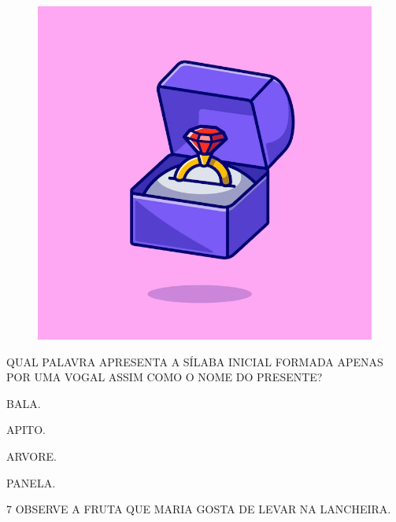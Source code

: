 \begin{figure}[H]
\centering
\includegraphics[width=\textwidth]{./media/image224.png}
\end{figure}

QUAL PALAVRA APRESENTA A SÍLABA INICIAL FORMADA APENAS POR UMA VOGAL ASSIM COMO O NOME DO PRESENTE?

\begin{escolha}

\item BALA.

\item APITO.

\item ARVORE.

\item PANELA.

\end{escolha}

\num{7} OBSERVE A FRUTA QUE MARIA GOSTA DE LEVAR NA LANCHEIRA.

